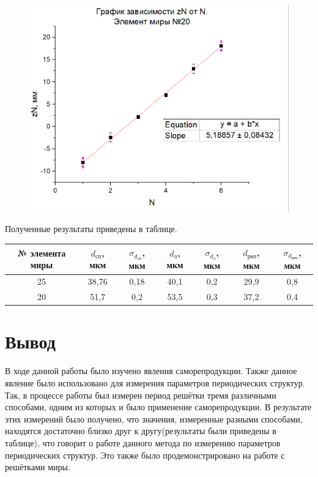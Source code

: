 \documentclass[a4paper,12pt]{article}
\begin{document}
\begin{figure}[H]
\centering
\includegraphics[scale=0.65]{graph5.png}
\end{figure}

Полученные результаты приведены в таблице.
\begin{table}[H]
\begin{tabular}{|c|c|c|c|c|c|c|}
\hline
№ элемента миры & $d_\text{сп}$, мкм & $\sigma_{d_\text{сп}}$, мкм & $d_\text{л}$, мкм & $\sigma_{d_\text{л}}$, мкм & $d_\text{реп}$, мкм & $\sigma_{d_\text{реп}}$, мкм \\ \hline
25 & 38,76 & 0,18 & 40,1 & 0,2 & 29,9 & 0,8 \\ \hline
20 & 51,7 & 0,2 & 53,5 & 0,3 & 37,2 & 0,4 \\ \hline
\end{tabular}
\end{table}
\section{Вывод}
В ходе данной работы было изучено явления саморепродукции. Также данное явление было использовано для измерения параметров периодических структур. Так, в процессе работы был измерен период решётки тремя различными способами, одним из которых и было применение саморепродукции. В результате этих измерений было получено, что значения, измеренные разными способами, находятся достаточно близко друг к другу(результаты были приведены в таблице), что говорит о работе данного метода по измерению параметров периодических структур. Это также было продемонстрировано на работе с решётками миры. 
\end{document}
